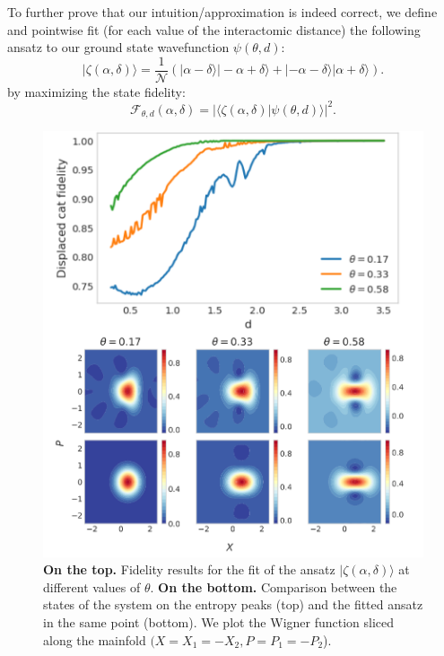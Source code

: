 \documentclass[reprint, amsmath, amssymb, floatfix, aps, pra]{revtex4-2}
\newcommand{\ket}[1]{|#1\rangle}
\newcommand{\braket}[3][2]{\langle #2|#3 \rangle}
\begin{document}
    To further prove that our intuition/approximation is indeed correct, we define and pointwise fit (for each value of the interactomic distance) the following ansatz to our ground state wavefunction $\psi(\theta, d)$:
    \begin{equation}
        \ket{\zeta(\alpha, \delta)} = \frac{1}{\mathcal N}\left(\ket{\alpha-\delta}\ket{-\alpha + \delta} + \ket{-\alpha-\delta}\ket{\alpha + \delta}\right).
    \end{equation}
    by maximizing the state fidelity:
    \begin{equation}
        \mathcal{F}_{\theta, d}(\alpha, \delta) = |\braket{\zeta(\alpha, \delta)}{\psi(\theta, d)}|^2.
    \end{equation}
    \begin{figure}[h]
        \vspace{0.5cm}
        \centering
        \includegraphics[scale=0.62]{figures/fidecats.pdf}
        \caption{\textbf{On the top.} Fidelity results for the fit of the ansatz $\ket{\zeta(\alpha, \delta)}$ at different values of $\theta$. \textbf{On the bottom.} Comparison between the states of the system on the entropy peaks (top) and the fitted ansatz in the same point (bottom). We plot the Wigner function sliced along the mainfold $(X = X_1 = -X_2, P = P_1 = -P_2$).}
        \label{fig:fidecats}
    \end{figure}
\end{document}
